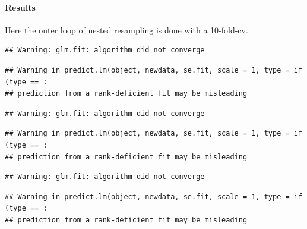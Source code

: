 \documentclass[
]{article}
\newenvironment{Shaded}{\begin{snugshade}}{\end{snugshade}}
\newcommand{\CommentTok}[1]{\textcolor[rgb]{0.56,0.35,0.01}{\textit{#1}}}
\newcommand{\DataTypeTok}[1]{\textcolor[rgb]{0.13,0.29,0.53}{#1}}
\newcommand{\KeywordTok}[1]{\textcolor[rgb]{0.13,0.29,0.53}{\textbf{#1}}}
\newcommand{\NormalTok}[1]{#1}
\newcommand{\OperatorTok}[1]{\textcolor[rgb]{0.81,0.36,0.00}{\textbf{#1}}}
\newcommand{\OtherTok}[1]{\textcolor[rgb]{0.56,0.35,0.01}{#1}}
\newcommand{\StringTok}[1]{\textcolor[rgb]{0.31,0.60,0.02}{#1}}
\let\oldparagraph\paragraph
\renewcommand{\paragraph}[1]{\oldparagraph{#1}\mbox{}}
\begin{document}
\hypertarget{results}{%
\paragraph{Results}\label{results}}

Here the outer loop of nested resampling is done with a 10-fold-cv.

\begin{Shaded}
\end{Shaded}

\begin{verbatim}
## Warning: glm.fit: algorithm did not converge
\end{verbatim}

\begin{verbatim}
## Warning in predict.lm(object, newdata, se.fit, scale = 1, type = if (type == :
## prediction from a rank-deficient fit may be misleading
\end{verbatim}

\begin{verbatim}
## Warning: glm.fit: algorithm did not converge
\end{verbatim}

\begin{verbatim}
## Warning in predict.lm(object, newdata, se.fit, scale = 1, type = if (type == :
## prediction from a rank-deficient fit may be misleading
\end{verbatim}

\begin{verbatim}
## Warning: glm.fit: algorithm did not converge
\end{verbatim}

\begin{verbatim}
## Warning in predict.lm(object, newdata, se.fit, scale = 1, type = if (type == :
## prediction from a rank-deficient fit may be misleading
\end{verbatim}
\end{document}
